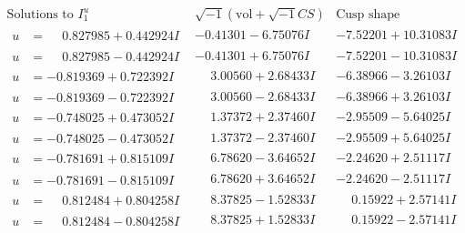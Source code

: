 \documentclass[1p]{elsarticle_modified}
\theoremstyle{definition}
\newcommand{\I}{\sqrt{-1}}
\begin{document}
$$\begin{array}{c|c|c}  
\text{Solutions to }I^u_{1}& \I (\text{vol} + \sqrt{-1}CS) & \text{Cusp shape}\\
 \hline 
\begin{aligned}
u &= \phantom{-}0.827985 + 0.442924 I\end{aligned}
 & -0.41301 - 6.75076 I & -7.52201 + 10.31083 I \\ \hline\begin{aligned}
u &= \phantom{-}0.827985 - 0.442924 I\end{aligned}
 & -0.41301 + 6.75076 I & -7.52201 - 10.31083 I \\ \hline\begin{aligned}
u &= -0.819369 + 0.722392 I\end{aligned}
 & \phantom{-}3.00560 + 2.68433 I & -6.38966 - 3.26103 I \\ \hline\begin{aligned}
u &= -0.819369 - 0.722392 I\end{aligned}
 & \phantom{-}3.00560 - 2.68433 I & -6.38966 + 3.26103 I \\ \hline\begin{aligned}
u &= -0.748025 + 0.473052 I\end{aligned}
 & \phantom{-}1.37372 + 2.37460 I & -2.95509 - 5.64025 I \\ \hline\begin{aligned}
u &= -0.748025 - 0.473052 I\end{aligned}
 & \phantom{-}1.37372 - 2.37460 I & -2.95509 + 5.64025 I \\ \hline\begin{aligned}
u &= -0.781691 + 0.815109 I\end{aligned}
 & \phantom{-}6.78620 - 3.64652 I & -2.24620 + 2.51117 I \\ \hline\begin{aligned}
u &= -0.781691 - 0.815109 I\end{aligned}
 & \phantom{-}6.78620 + 3.64652 I & -2.24620 - 2.51117 I \\ \hline\begin{aligned}
u &= \phantom{-}0.812484 + 0.804258 I\end{aligned}
 & \phantom{-}8.37825 - 1.52833 I & \phantom{-}0.15922 + 2.57141 I \\ \hline\begin{aligned}
u &= \phantom{-}0.812484 - 0.804258 I\end{aligned}
 & \phantom{-}8.37825 + 1.52833 I & \phantom{-}0.15922 - 2.57141 I \\ \hline\begin{aligned}

\end{aligned}
\end{array}$$
\end{document}
